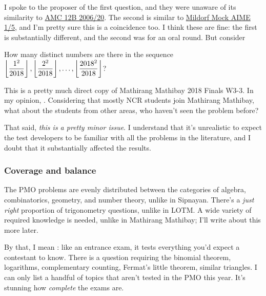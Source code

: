 \documentclass[11pt,paper=letter]{scrartcl}
\begin{document}
I spoke to the proposer of the first question, and they were unaware of its similarity to \href{https://artofproblemsolving.com/wiki/index.php/2006_AMC_12B_Problems/Problem_20}{AMC 12B 2006/20}. The second is similar to \href{http://services.artofproblemsolving.com/download.php?id=YXR0YWNobWVudHMvYy80LzBkNzcyN2M0ZmJkYjhiMTAxZjA1NGZjZWIyYzBjZmE4ZTJmNmVk&rn=VGhvbWFzTWlsZG9yZkFpbWVzLnBkZg==}{Mildorf Mock AIME 1/5}, and I'm pretty sure this is a coincidence too. I think these are fine: the first is substantially different, and the second was for an oral round. But consider

\begin{probboxed}
  [Areas I19] How many distinct numbers are there in the sequence $\left\lfloor \dfrac{1^2}{2018} \right\rfloor, \left\lfloor \dfrac{2^2}{2018} \right\rfloor, \ldots, \left\lfloor \dfrac{2018^2}{2018} \right\rfloor$?
\end{probboxed}

This is a pretty much direct copy of Mathirang Mathibay 2018 Finals W3-3. In my opinion, . Considering that mostly NCR students join Mathirang Mathibay, what about the students from other areas, who haven't seen the problem before?

That said, \emph{this is a pretty minor issue}. I understand that it's unrealistic to expect the test developers to be familiar with all the problems in the literature, and I doubt that it substantially affected the results.

\subsubsection*{Coverage and balance}

The PMO problems are evenly distributed between the categories of algebra, combinatorics, geometry, and number theory, unlike in Sipnayan. There's a \emph{just right} proportion of trigonometry questions, unlike in LOTM. A wide variety of required knowledge is needed, unlike in Mathirang Mathibay; I'll write about this more later.

By that, I mean : like an entrance exam, it tests everything you'd expect a contestant to know. There is a question requiring the binomial theorem, logarithms, complementary counting, Fermat's little theorem, similar triangles. I can only list a handful of topics that aren't tested in the PMO this year. It's stunning how \emph{complete} the exams are.
\end{document}
